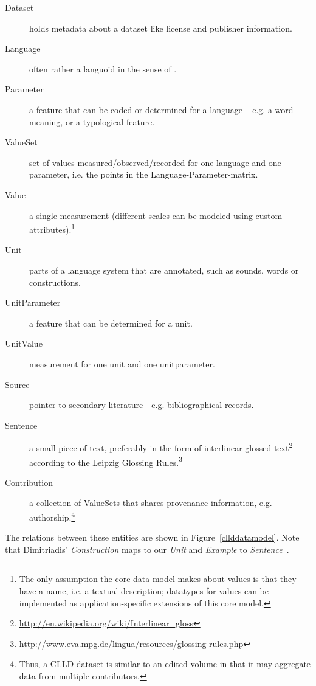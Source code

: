 \documentclass[a4paper,10pt]{article}
\begin{document}
%
%

\begin{description}
\item[Dataset] holds metadata about a dataset like license and publisher information.
\item[Language] often rather a languoid in the sense of .
\item[Parameter] a feature that can be coded or determined for a language
-- e.g. a word meaning, or a typological feature.
\item[ValueSet] set of values measured/observed/recorded for one language and one parameter,
i.e. the points in the Language-Parameter-matrix.
\item[Value] a single measurement (different scales can be modeled using custom attributes).\footnote{The only assumption
the core data model makes about values is that they have a name, i.e. a textual description;
datatypes for values can be implemented as application-specific extensions of this core model.}
\item[Unit] parts of a language system that are annotated, such as sounds, words or constructions.
\item[UnitParameter] a feature that can be determined for a unit.
\item[UnitValue] measurement for one unit and one unitparameter.
\item[Source] pointer to secondary literature - e.g. bibliographical records.
\item[Sentence] a small piece of text, preferably in the form of interlinear glossed
text\footnote{\url{http://en.wikipedia.org/wiki/Interlinear\_gloss}} according to the
Leipzig Glossing Rules.\footnote{\url{http://www.eva.mpg.de/lingua/resources/glossing-rules.php}}
\item[Contribution] a collection of ValueSets that shares provenance information, e.g. authorship.\footnote{Thus,
a CLLD dataset is similar to an edited volume in that it may aggregate data from multiple contributors.}
\end{description}

The relations between these entities are shown in Figure~\ref{cllddatamodel}. Note that
Dimitriadis' \emph{Construction} maps to our \emph{Unit} and \emph{Example} to \emph{Sentence}~\cite[p.~15]{burs}.
\end{document}
